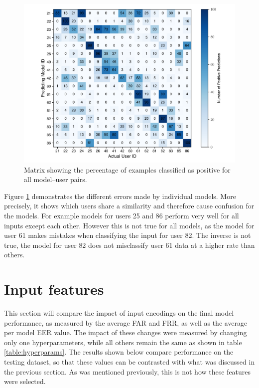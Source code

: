 \begin{figure}[H]
	\centering
	\includegraphics[width=\textwidth]{images/all_models_5_len40.pdf} %
	\caption{Matrix showing the percentage of examples classified as positive for all model--user pairs.}
	\label{fig:all_models_5_len40}
\end{figure}

Figure \ref{fig:all_models_5_len40} demonstrates the different errors made by individual models. More precisely, it shows which users share a similarity and therefore cause confusion for the models. For example models for users 25 and 86 perform very well for all inputs except each other. However this is not true for all models, as the model for user 61 makes mistakes when classifying the input for user 82. The inverse is not true, the model for user 82 does not misclassify user 61 data at a higher rate than others.

\section{Input features}
This section will compare the impact of input encodings on the final model performance, as measured by the average FAR and FRR, as well as the average per model EER value. The impact of these changes were measured by changing only one hyperparameters, while all others remain the same as shown in table \ref{table:hyperparams}. The results shown below compare performance on the testing dataset, so that these values can be contrasted with what was discussed in the previous section. As was mentioned previously, this is not how these features were selected.

